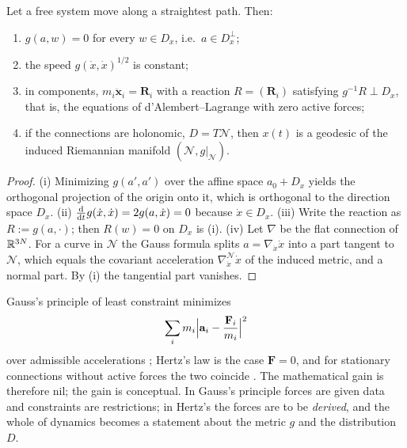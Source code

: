 \begin{proposition}\label{prop:hz-law}
Let a free system move along a straightest path. Then:
\begin{enumerate}[label=(\roman*),nosep]
  \item $g(a,w)=0$ for every $w\in D_x$, i.e.\ $a\in D_x^{\perp}$;
  \item the speed $g(\dot x,\dot x)^{1/2}$ is constant;
  \item in components, $m_i\ddot{\mathbf x}_i=\mathbf R_i$ with a reaction
        $R=(\mathbf R_i)$ satisfying $g^{-1}\!R\perp D_x$, that is, the
        equations of d'Alembert--Lagrange with zero active forces;
  \item if the connections are holonomic, $D=T\mathcal N$, then $x(t)$ is a
        geodesic of the induced Riemannian manifold $(\mathcal N,g|_{\mathcal N})$.
\end{enumerate}
\end{proposition}

\begin{proof}
(i) Minimizing $g(a',a')$ over the affine space $a_0+D_x$ yields the
orthogonal projection of the origin onto it, which is orthogonal to the
direction space $D_x$. (ii) $\frac{\mathrm{d}}{\mathrm{d} t}g(\dot x,\dot x)=2g(a,\dot x)=0$
because $\dot x\in D_x$. (iii) Write the reaction as $R:=g(a,\cdot)$; then
$R(w)=0$ on $D_x$ is (i). (iv) Let $\nabla$ be the flat connection of
$\mathbb{R}^{3N}$. For a curve in $\mathcal N$ the Gauss formula splits $a=\nabla_{\dot x}\dot x$
into a part tangent to $\mathcal N$, which equals the covariant acceleration
$\nabla^{\mathcal N}_{\dot x}\dot x$ of the induced metric, and a normal part.
By (i) the tangential part vanishes.
\end{proof}

\begin{remark}
Gauss's principle of least constraint minimizes
\[
  \sum_i m_i\Bigl|\mathbf a_i-\frac{\mathbf F_i}{m_i}\Bigr|^2
\]
over admissible accelerations \cite{hdp:gauss1829}; Hertz's law is the case
$\mathbf F=0$, and for stationary connections without active forces the two
coincide \cite{hdp:eom-hertz}. The mathematical gain is therefore nil; the
gain is conceptual. In Gauss's principle forces are given data and
constraints are restrictions; in Hertz's the forces are to be \emph{derived},
and the whole of dynamics becomes a statement about the metric $g$ and the
distribution $D$.
\end{remark}

